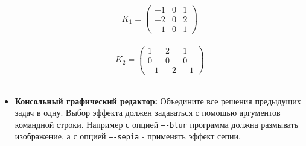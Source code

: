 \documentclass{article}
\begin{document}
\begin{itemize}
\begin{multicols}{2}
$$
K_1 = 
\begin{pmatrix}
-1 & 0 & 1 \\
-2 & 0 & 2 \\
-1 & 0 & 1
\end{pmatrix}
$$\\
$$
K_2 = 
\begin{pmatrix}
1 & 2 & 1 \\
0 & 0 & 0 \\
-1 & -2 & -1
\end{pmatrix}
$$\\
\end{multicols}
\item \textbf{Консольный графический редактор:} Объедините все решения предыдущих задач в одну. Выбор эффекта должен задаваться с помощью аргументов командной строки. Например с опцией \texttt{----blur} программа должна размывать изображение, а с опцией \texttt{----sepia} - применять эффект сепии.

\end{itemize}
\end{document}
